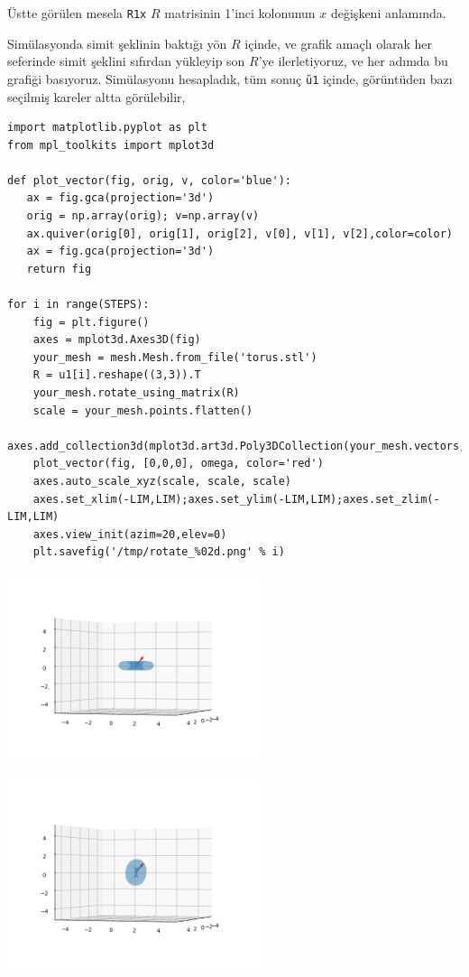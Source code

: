 \documentclass[12pt,fleqn]{article}\usepackage{../../common}
\begin{document}
Üstte görülen mesela \verb!R1x! $R$ matrisinin 1'inci kolonunun $x$ değişkeni
anlamında.

Simülasyonda simit şeklinin baktığı yön $R$ içinde, ve grafik amaçlı olarak her
seferinde simit şeklini sıfırdan yükleyip son $R$'ye ilerletiyoruz, ve her
adımda bu grafiği basıyoruz.  Simülasyonu hesapladık, tüm sonuç \verb!ü1!
içinde, görüntüden bazı seçilmiş kareler altta görülebilir,

\begin{verbatim}
import matplotlib.pyplot as plt
from mpl_toolkits import mplot3d

def plot_vector(fig, orig, v, color='blue'):
   ax = fig.gca(projection='3d')
   orig = np.array(orig); v=np.array(v)
   ax.quiver(orig[0], orig[1], orig[2], v[0], v[1], v[2],color=color)
   ax = fig.gca(projection='3d')  
   return fig

for i in range(STEPS):
    fig = plt.figure()
    axes = mplot3d.Axes3D(fig)
    your_mesh = mesh.Mesh.from_file('torus.stl')
    R = u1[i].reshape((3,3)).T
    your_mesh.rotate_using_matrix(R)
    scale = your_mesh.points.flatten()
    axes.add_collection3d(mplot3d.art3d.Poly3DCollection(your_mesh.vectors,alpha=0.3))
    plot_vector(fig, [0,0,0], omega, color='red')
    axes.auto_scale_xyz(scale, scale, scale)
    axes.set_xlim(-LIM,LIM);axes.set_ylim(-LIM,LIM);axes.set_zlim(-LIM,LIM)
    axes.view_init(azim=20,elev=0)
    plt.savefig('/tmp/rotate_%02d.png' % i)  
\end{verbatim}

\includegraphics[width=20em]{sim1/rotate_00.png}

\includegraphics[width=20em]{sim1/rotate_08.png}
\end{document}
